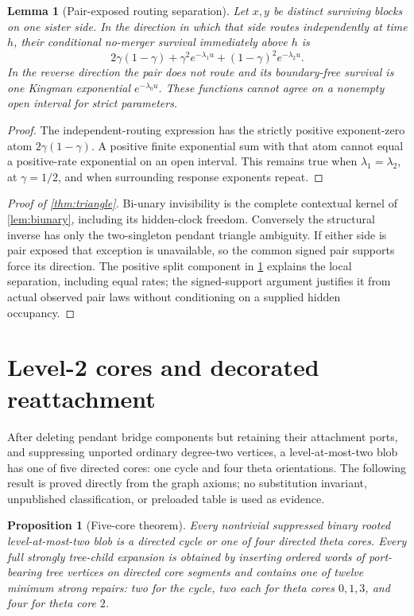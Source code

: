 \documentclass[11pt]{article}
\newtheorem{lemma}[theorem]{Lemma}
\newtheorem{proposition}[theorem]{Proposition}
\begin{document}
\begin{lemma}[Pair-exposed routing separation]
\label{lem:pair-exposed}
Let $x,y$ be distinct surviving blocks on one sister side.  In the direction
in which that side routes independently at time $h$, their conditional
no-merger survival immediately above $h$ is
\[
 2\gamma(1-\gamma)+\gamma^2e^{-\lambda_1u}
 +(1-\gamma)^2e^{-\lambda_2u}.
\]
In the reverse direction the pair does not route and its boundary-free
survival is one Kingman exponential $e^{-\lambda_0u}$.  These functions cannot
agree on a nonempty open interval for strict parameters.
\end{lemma}

\begin{proof}
The independent-routing expression has the strictly positive exponent-zero
atom $2\gamma(1-\gamma)$.  A positive finite exponential sum with that atom
cannot equal a positive-rate exponential on an open interval.  This remains
true when $\lambda_1=\lambda_2$, at $\gamma=1/2$, and when surrounding response
exponents repeat.
\end{proof}

\begin{proof}[Proof of \cref{thm:triangle}]
Bi-unary invisibility is the complete contextual kernel of
\cref{lem:biunary}, including its hidden-clock freedom.  Conversely the
structural inverse has only the two-singleton pendant triangle ambiguity.
If either side is pair exposed that exception is unavailable, so the common
signed pair supports force its direction.  The positive split component in
\cref{lem:pair-exposed} explains the local separation, including equal rates;
the signed-support argument justifies it from actual observed pair laws
without conditioning on a supplied hidden occupancy.
\end{proof}

\section{Level-2 cores and decorated reattachment}
\label{sec:cores}
After deleting pendant bridge components but retaining their attachment ports,
and suppressing unported ordinary degree-two vertices, a level-at-most-two blob
has one of five directed cores: one cycle and four theta orientations.  The
following result is proved directly from the graph axioms; no substitution
invariant, unpublished classification, or preloaded table is used as evidence.

\begin{proposition}[Five-core theorem]
\label{prop:five-core}
Every nontrivial suppressed binary rooted level-at-most-two blob is a directed cycle or one of four directed theta cores.  Every full strongly tree-child expansion is obtained by inserting ordered words of port-bearing tree vertices on directed core segments and contains one of twelve minimum strong repairs: two for the cycle, two each for theta cores $0,1,3$, and four for theta core $2$.
\end{proposition}
\end{document}
